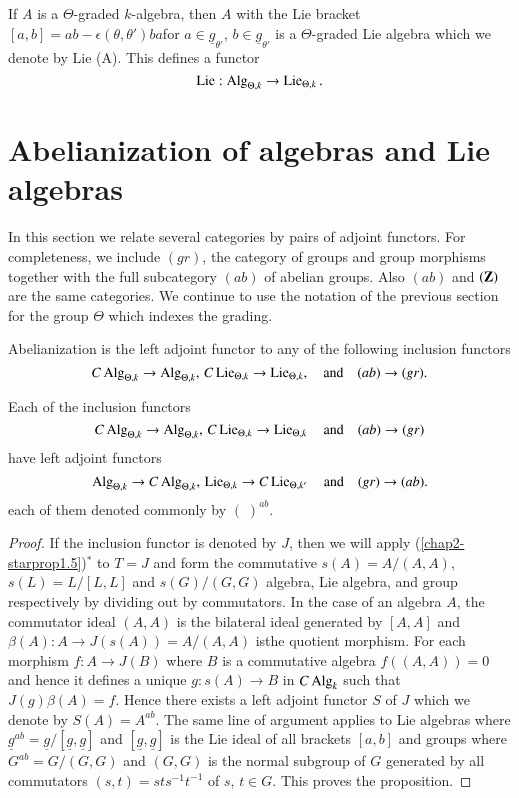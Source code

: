 \begin{example}\label{chap2-exam2.5}
If $A$ is a $\Theta$-graded $k$-algebra, then $A$ with the Lie bracket
$[a,b]=ab-\epsilon(\theta,\theta')ba$\pageoriginale for $a\in
\underline{g}_{\theta'}$, $b\in \underline{g}_{\theta'}$ is a
$\Theta$-graded Lie algebra which we denote by Lie (A). This defines a
functor
$$
\operatorname{Lie}:\operatorname{Alg}_{\Theta,k}\to \operatorname{Lie}_{\Theta,k}.
$$
\end{example}

\section{Abelianization of algebras and Lie
  algebras}\label{chap2-sec3}

In this section we relate several categories by pairs of adjoint
functors. For completeness, we include $(gr)$, the category of groups
and group morphisms together with the full subcategory $(ab)$ of
abelian groups. Also $(ab)$ and $(\mathbf{Z})$ are the same categories. We
continue to use the notation of the previous section for the group
$\Theta$ which indexes the grading.

\begin{definition}\label{chap2-defi3.1}
Abelianization is the left adjoint functor to any of the following
inclusion functors
$$
C\operatorname{Alg}_{\Theta,k}\to \operatorname{Alg}_{\Theta,k},\, C\operatorname{Lie}_{\Theta,k}\to
\operatorname{Lie}_{\Theta,k},\quad\text{and}\quad (ab)\to (gr).
$$
\end{definition}

\begin{proposition}\label{chap2-prop3.2} 
Each of the inclusion functors
$$
C\operatorname{Alg}_{\Theta,k}\to \operatorname{Alg}_{\Theta,k},\, C\operatorname{Lie}_{\Theta,k}\to
\operatorname{Lie}_{\Theta,k}\quad \text{and}\quad (ab)\to (gr)
$$
have left adjoint functors
$$
\operatorname{Alg}_{\Theta,k}\to C\operatorname{Alg}_{\Theta,k},\, \operatorname{Lie}_{\Theta,k}\to
C\operatorname{Lie}_{\Theta,k'}\quad\text{and}\quad (gr)\to (ab).
$$
each of them denoted commonly by $(\;)^{ab}$.
\end{proposition}

\begin{proof}
If the inclusion functor is denoted by $J$, then we will apply
(\ref{chap2-starprop1.5})$^{*}$ to $T=J$ and form the commutative
$s(A)=A/(A,A)$, $s(L)=L/[L,L]$ and $s(G)/(G,G)$ algebra, Lie algebra,
and group respectively by dividing out by commutators. In the case of
an algebra $A$, the commutator ideal $(A,A)$ is the bilateral ideal
generated by $[A,A]$ and $\beta(A):A\to J(s(A))=A/(A,A)$
is\pageoriginale the quotient morphism. For each morphism $f:A\to
J(B)$ where $B$ is a commutative algebra $f((A,A))=0$ and hence it
defines a unique $g:s(A)\to B$ in $C\operatorname{Alg}_{k}$ such that
$J(g)\beta(A)=f$. Hence there exists a left adjoint functor $S$ of $J$
which we denote by $S(A)=A^{ab}$. The same line of argument applies to
Lie algebras where
$\underline{g}^{ab}=\underline{g}/[\underline{g},\underline{g}]$ and
$[\underline{g},\underline{g}]$ is the Lie ideal of all brackets
$[a,b]$ and groups where $G^{ab}=G/(G,G)$ and $(G,G)$ is the normal
subgroup of $G$ generated by all commutators $(s,t)=sts^{-1}t^{-1}$ of
$s$, $t\in G$. This proves the proposition.  
\end{proof}

